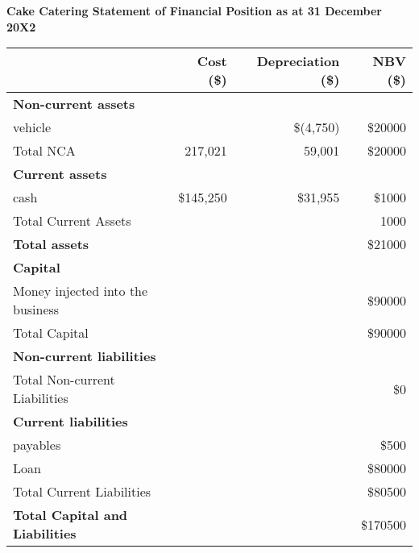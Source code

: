 

\textbf{Cake Catering Statement of Financial Position as at 31 December 20X2}

\begin{center}
\begin{tabular}{lrrr}
\toprule
 & \textbf{Cost (\$)} & \textbf{Depreciation (\$)} & \textbf{NBV (\$)} \\
\midrule
\textbf{Non-current assets} & & & \\
vehicle & & \$(4,750) & \$20000 \\ 

\addlinespace
Total NCA & 217,021 & 59,001 & \$20000 \\
\midrule
\textbf{Current assets} & & & \\
cash & \$145,250 & \$31,955 & \$1000 \\ 

\addlinespace
Total Current Assets & & & 1000 \\
\midrule
\textbf{Total assets} & & & \$21000 \\
\midrule
\textbf{Capital} & & & \\
Money injected into the business & & & \$90000 \\ 

\addlinespace
Total Capital & & & \$90000 \\
\midrule
\textbf{Non-current liabilities} & & & \\

\addlinespace
Total Non-current Liabilities & & & \$0 \\
\midrule
\textbf{Current liabilities} & & & \\
payables & & & \$500 \\ 
Loan & & & \$80000 \\ 

\addlinespace
Total Current Liabilities & & & \$80500\\
\midrule
\textbf{Total Capital and Liabilities} & & & \$170500 \\
\bottomrule
\end{tabular}
\end{center}

      
